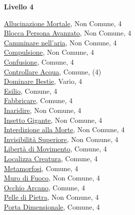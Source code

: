 \begin{multicols}{3}
{{\textbf{Livello 4}   

\hyperlink{Allucinazione Mortale}{Allucinazione Mortale}, Non Comune, 4\\
\hyperlink{Blocca Persona Avanzato}{Blocca Persona Avanzato}, Non Comune, 4\\
\hyperlink{Camminare nell'aria}{Camminare nell'aria}, Non Comune, 4\\
\hyperlink{Compulsione}{Compulsione}, Non Comune, 4\\
\hyperlink{Confusione}{Confusione}, Comune, 4\\
\hyperlink{Controllare Acqua}{Controllare Acqua}, Comune, (4)\\
\hyperlink{Dominare Bestie}{Dominare Bestie}, Vario, 4\\
\hyperlink{Esilio}{Esilio}, Comune, 4\\
\hyperlink{Fabbricare}{Fabbricare}, Comune, 4\\
\hyperlink{Inaridire}{Inaridire}, Non Comune, 4\\
\hyperlink{Insetto Gigante}{Insetto Gigante}, Non Comune, 4\\
\hyperlink{Interdizione alla Morte}{Interdizione alla Morte}, Non Comune, 4\\
\hyperlink{Invisibilità Superiore}{Invisibilità Superiore}, Non Comune, 4\\
\hyperlink{Libertà di Movimento}{Libertà di Movimento}, Comune, 4\\
\hyperlink{Localizza Creatura}{Localizza Creatura}, Comune, 4\\
\hyperlink{Metamorfosi}{Metamorfosi}, Comune, 4\\
\hyperlink{Muro di Fuoco}{Muro di Fuoco}, Non Comune, 4\\
\hyperlink{Occhio Arcano}{Occhio Arcano}, Comune, 4\\
\hyperlink{Pelle di Pietra}{Pelle di Pietra}, Non Comune, 4\\
\hyperlink{Porta Dimensionale}{Porta Dimensionale}, Comune, 4\\
}}
\end{multicols}
